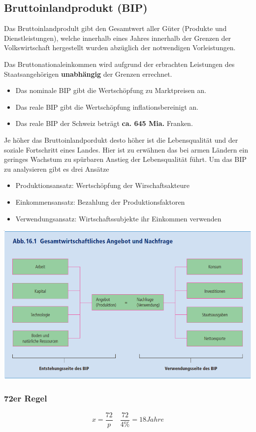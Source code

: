\subsection{Bruttoinlandprodukt (BIP)}
\begin{center}
    Das Bruttoinlandprodult gibt den Gesamtwert aller Güter (Produkte und Dienstleistungen), welche innerhalb eines Jahres innerhalb der Grenzen der Volkswirtschaft hergestellt wurden abzüglich der notwendigen Vorleistungen.
\end{center}
Das Bruttonationaleinkommen wird aufgrund der erbrachten Leistungen des Staatsangehörigen \textbf{unabhängig} der Grenzen errechnet.
\begin{itemize}
	\item Das nominale BIP gibt die Wertschöpfung zu Marktpreisen an.
	\item Das reale BIP gibt die Wertschöpfung inflationsbereinigt an.
	\item Das reale BIP der Schweiz beträgt \textbf{ca. 645 Mia.} Franken.
\end{itemize}
\vspace{0.5cm}
Je höher das Bruttoinlandpordukt desto höher ist die  Lebensqualität und der soziale Fortschritt eines Landes. Hier ist zu erwähnen das bei armen Ländern ein geringes Wachstum zu spürbaren Anstieg der Lebensqualität führt. Um das BIP zu analysieren gibt es drei Ansätze
\begin{itemize}
	\item Produktionsansatz: Wertschöpfung der Wirschaftsakteure
	\item Einkommensansatz: Bezahlung der Produktionsfaktoren
	\item Verwendungsansatz: Wirtschaftssubjekte ihr Einkommen verwenden
\end{itemize}
\includegraphics[width=0.8\linewidth]{images/bip.png}
\subsubsection{72er Regel}
\begin{equation*}
	x=\frac{72}{p} \quad \frac{72}{4\%}= 18 Jahre
\end{equation*}

\clearpage
\pagebreak